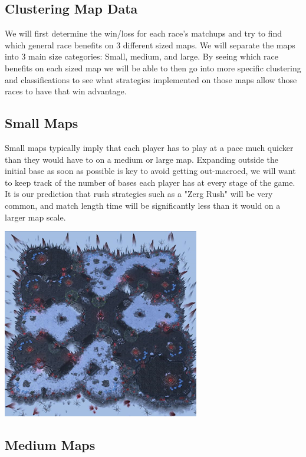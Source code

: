 \documentclass[a4paper,12pt]{report}
\begin{document}
\subsection{Clustering Map Data}

We will first determine the win/loss for each race’s matchups and try to find which general race benefits on 3 different sized maps. We will separate the maps into 3 main size categories: Small, medium, and large. By seeing which race benefits on each sized map we will be able to then go into more specific clustering and classifications to see what strategies implemented on those maps allow those races to have that win advantage.

\subsection{Small Maps}

Small maps typically imply that each player has to play at a pace much quicker than they would have to on a medium or large map. Expanding outside the initial base as soon as possible is key to avoid getting out-macroed, we will want to keep track of the number of bases each player has at every stage of the game. It is our prediction that rush strategies such as a "Zerg Rush" will be very common, and match length time will be significantly less than it would on a larger map scale.

\begin{center}
    \captionsetup{type=figure}
    \includegraphics[width=.5\linewidth]{media/smallmap.png}
\end{center} 

\subsection{Medium Maps}
\end{document}
